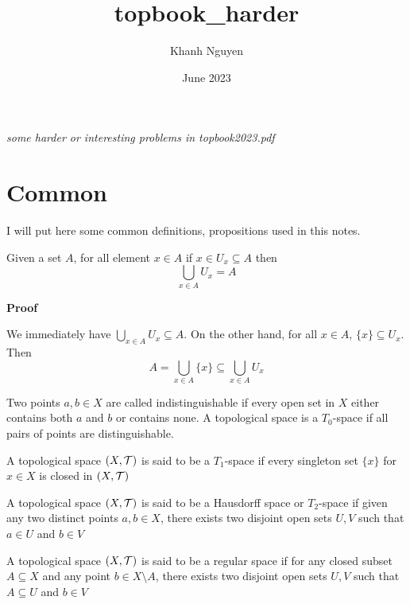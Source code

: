 \documentclass{article}
\title{topbook\_harder}
\author{Khanh Nguyen}
\date{June 2023}
\begin{document}
\maketitle

\emph{some harder or interesting problems in topbook2023.pdf}

\section*{Common}

I will put here some common definitions, propositions used in this notes.

\begin{proposition}
    Given a set $A$, for all element $x \in A$ if $x \in U_x \subseteq A$ then
    $$
        \bigcup_{x \in A} U_x = A
    $$
\end{proposition} 

\textbf{Proof}

We immediately have $\bigcup_{x \in A} U_x \subseteq A$. On the other hand, for all $x \in A$, $\{ x \} \subseteq U_x$. Then
$$
    A = \bigcup_{x \in A} \{ x \} \subseteq \bigcup_{x \in A} U_x
$$

\begin{definition}
    Two points $a, b \in X$ are called indistinguishable if every open set in $X$ either contains both $a$ and $b$ or contains none.
    A topological space is a $T_0$-space if all pairs of points are distinguishable.
\end{definition}

\begin{definition}[$T_1$-space]
    A topological space $(X, \mathcal{T})$ is said to be a $T_1$-space if every singleton set $\{ x \}$ for $x \in X$ is closed in $(X, \mathcal{T})$
\end{definition}

\begin{definition}
    A topological space $(X, \mathcal{T})$ is said to be a Hausdorff space or $T_2$-space if given any two distinct points $a, b \in X$, there exists two disjoint open sets $U, V$ such that $a \in U$ and $b \in V$
\end{definition}

\begin{definition}
    A topological space $(X, \mathcal{T})$ is said to be a regular space if for any closed subset $A \subseteq X$ and any point $b \in X \setminus A$, there exists two disjoint open sets $U, V$ such that $A \subseteq U$ and $b \in V$
\end{definition}
\end{document}
